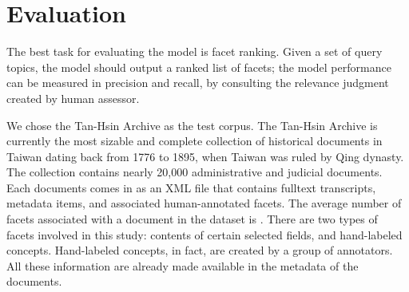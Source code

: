 \section{Evaluation}


The best task for evaluating the model is facet ranking.  Given a set of query
topics, the model should output a ranked list of facets; the model performance
can be measured in precision and recall, by consulting the relevance judgment
created by human assessor.  

We chose the Tan-Hsin Archive as the test corpus.  The
Tan-Hsin Archive is currently the most sizable and complete collection of
historical documents in Taiwan dating back from 1776 to 1895, when Taiwan was
ruled by Qing dynasty.  The collection contains nearly 20,000 administrative
and judicial documents.  Each documents comes in as an XML file that contains
fulltext transcripts, metadata items, and associated human-annotated facets.
The average number of facets associated with a document in the dataset is
.  There are two types of facets involved in this study:
contents of certain selected fields, and hand-labeled concepts.  Hand-labeled
concepts, in fact, are created by a group of annotators.  All these information
are already made available in the metadata of the documents.

